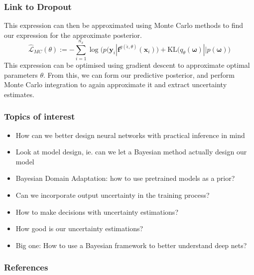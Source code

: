 \documentclass{beamer}
\newcommand{\mb}[1]{\mathbf{#1}}
\begin{document}
% 
% 
% 
% 
\begin{frame}
  \frametitle{Link to Dropout}

  This expression can then be approximated using Monte Carlo methods to find our expression for the approximate posterior.
  \begin{equation*}
    \hat{\mathcal{L}}_{MC}(\theta) := - \sum_{i=1}^{n_x}
    \log\Big( p(\mb{y}_i | \mb{f}^{g(\hat{\epsilon}, \theta)} (\mb{x}_i) \Big)+
    \text{KL}\Big(q_\theta (\mb{\omega}) || p (\mb{\omega}) \Big)
  \end{equation*}
  This expression can be optimised using gradient descent to approximate optimal parameters $\theta$. From this, we can form our predictive posterior, and perform Monte Carlo integration to again approximate it and extract uncertainty estimates.
\end{frame}
% 
% 
% 
% 

\begin{frame}
  \frametitle{Topics of interest}
  \begin{itemize}
  \item How can we better design neural networks with practical inference in mind
  \item Look at model design, ie. can we let a Bayesian method actually design our model
  \item Bayesian Domain Adaptation: how to use pretrained models as a prior?
  \item Can we incorporate output uncertainty in the training process?
  \item How to make decisions with uncertainty estimations?
  \item How good is our uncertainty estimations?
  \item Big one: How to use a Bayesian framework to better understand deep nets?
  \end{itemize}
\end{frame}
% 
% 
% 
% 
\begin{frame}[allowframebreaks]
  \frametitle{References}
  \printbibliography
\end{frame}
\end{document}
